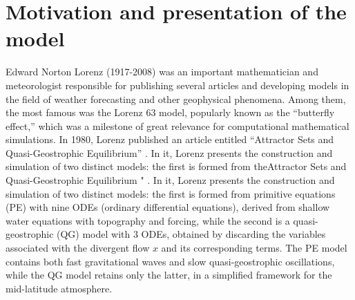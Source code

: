\section{Motivation and presentation of the model} \label{sec:ch01_model_presentation}
Edward Norton Lorenz (1917-2008) was an important mathematician and meteorologist responsible for publishing several articles and developing models in the field of weather forecasting and other geophysical phenomena.
Among them, the most famous was the Lorenz 63 model, popularly known as the “butterfly effect,” which was a milestone of great relevance for computational mathematical simulations.
In 1980, Lorenz published an article entitled “Attractor Sets and Quasi-Geostrophic Equilibrium” \citep{Lorenz1980}. In it, Lorenz presents the construction and simulation of two distinct models: the first is formed from the{Attractor Sets and Quasi-Geostrophic Equilibrium }" \citep{Lorenz1980}. In it, Lorenz presents the construction and simulation of two distinct models: the first is formed from primitive equations (PE) with nine ODEs (ordinary differential equations), derived from shallow water equations with topography and forcing, while the second is a quasi-geostrophic (QG) model with 3 ODEs, obtained by discarding the variables associated with the divergent flow $x$ and its corresponding terms. The PE model contains both fast gravitational waves and slow quasi-geostrophic oscillations, while the QG model retains only the latter, in a simplified framework for the mid-latitude atmosphere.

